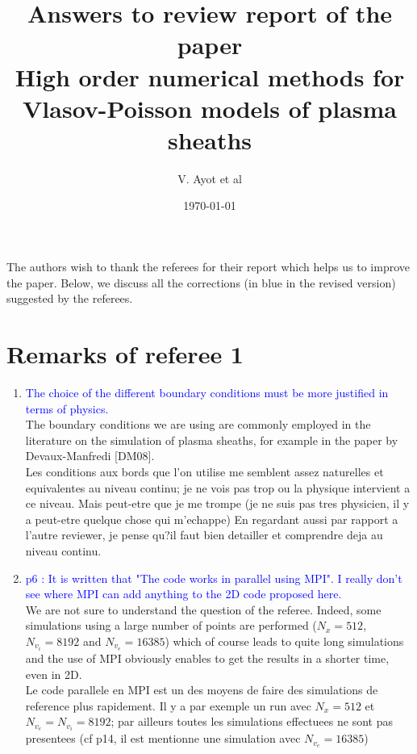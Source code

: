 \documentclass{article}
\title{Answers to review report of the paper\\
\textbf{High order numerical methods for Vlasov-Poisson models of plasma sheaths}}
\author{V. Ayot et al}
\date{\today}
\begin{document}
\maketitle
\Large

The authors  wish to thank the referees for their report which helps us to improve the paper. Below, we discuss all the corrections (in blue in the revised version) suggested by the referees.

\section{Remarks of referee 1}

\begin{enumerate}
    \item \textcolor{blue}{The choice of the different boundary conditions must be more justified in terms of physics. }\\
The boundary conditions we are using are commonly employed in the literature on the simulation of plasma sheaths, 
for example in the paper by Devaux-Manfredi [DM08].   \\%
{\small Les conditions aux bords que l'on utilise me semblent assez naturelles et equivalentes au niveau continu; je ne vois pas trop ou la physique intervient a ce niveau.
Mais peut-etre que je me trompe (je ne suis pas tres physicien, il y a peut-etre quelque chose qui m'echappe)
En regardant aussi par rapport a l'autre reviewer, je pense qu?il faut bien detailler et comprendre deja au niveau continu.}
    \item \textcolor{blue}{p6 : It is written that "The code works in parallel using MPI". I really don't see where MPI can add anything to the 2D code proposed here. }\\ 
    We are not sure to understand the question of the referee. Indeed, some simulations using a large number of points are performed 
    ($N_x=512$, $N_{v_i}=8192$ and $N_{v_e}=16385$) which of course leads to quite long simulations and the use of MPI obviously 
    enables to get the results in a shorter time, even in 2D. \\
    {\small Le code parallele en MPI est un des moyens de faire des simulations de reference plus rapidement.
Il y a par exemple un run avec $N_x=512$ et $N_{v_e}=N_{v_i}=8192$; par ailleurs toutes les simulations effectuees ne sont pas presentees
(cf p14, il est mentionne une simulation avec $N_{v_e}=16385$)}

\end{enumerate}
\end{document}
